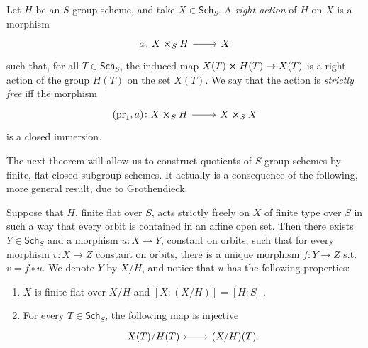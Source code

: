 \begin{defn}
	Let $H$ be an $S$-group scheme, and take $X \in \mathsf{Sch}_{ S }$.
	A {\em right action} of $H$ on $X$ is a morphism
	\begin{equation*}
	\begin{tikzcd}[row sep = 0ex
		,/tikz/column 1/.append style={anchor=base east}
		,/tikz/column 2/.append style={anchor=base west}]
		a\colon X \cross_{ S } H \arrow[r, "", rightarrow] &
		X
	\end{tikzcd}
	\end{equation*} 
	such that, for all $T \in \mathsf{Sch}_{ S }$, the induced map
	$X(T) \cross H(T) \to  X(T)$ is a right action of the
	group $H(T)$ on the set $X(T)$.
	We say that the action is {\em strictly free} iff the morphism
	\begin{equation*}
	\begin{tikzcd}[row sep = 0ex
		,/tikz/column 1/.append style={anchor=base east}
		,/tikz/column 2/.append style={anchor=base west}]
		(\mathrm{pr}_1, a)\colon X \cross_{ S } H \arrow[r, "", rightarrow] &
		X \cross_{ S } X
	\end{tikzcd}
	\end{equation*} 
	is a closed immersion.
\end{defn}


\noindent
The next theorem will allow us to construct quotients of
$S$-group schemes by finite, flat closed subgroup schemes.
It actually is a consequence of the following, more general result, due to Grothendieck.
\begin{thm}
	Suppose that $H$, finite flat over $S$, acts strictly freely on $X$
	of finite type over $S$ in such a way that every orbit is contained in an affine open set.
	Then there exists $Y \in \mathsf{Sch}_{ S }$ and a morphism $u\colon X \to Y$,
	constant on orbits, such that for every morphism $v\colon X \to Z$ constant on orbits,
	there is a unique morphism $f\colon Y \to Z$ s.t. $v = f \circ u$.
	We denote $Y$ by $X/H$, and notice that $u$ has the following properties:
\begin{enumerate}
	\item $X$ is finite flat over $X/H$ and $[X:(X/H)] = [H:S]$.
		
	\item For every $T \in \mathsf{Sch}_{ S }$, the following map is injective
		\begin{equation*}
		\begin{tikzcd}
			X(T)/H(T) \arrow[r, "", rightarrowtail] &
			(X/H)(T)
		.\end{tikzcd}
		\end{equation*}
\end{enumerate}
\end{thm}


